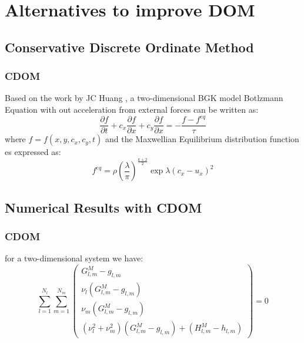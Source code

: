 \section{Alternatives to improve DOM}
\subsection{Conservative Discrete Ordinate Method}

\begin{frame}
	\frametitle{CDOM}
	Based on the work by JC Huang \cite{Yang1995323}, a two-dimensional BGK model Botlzmann Equation with out acceleration from external forces can be written as:
	\begin{equation}
		\frac{\partial f}{\partial t} + c_x \frac{\partial f}{\partial x} + c_y \frac{\partial f}{\partial x} = -\frac{f - f^{eq}}{\tau}
	\end{equation}
	where $f = f (x,y,c_x,c_y,t)$ and the Maxwellian Equilibrium distribution function es expressed as:
	\begin{equation}
		f^{eq} = \rho \left( \frac{\lambda}{\pi} \right) ^{\frac{k+2}{2}} \exp{\lambda (c_x - u_x)^2}
	\end{equation}
\end{frame}

\subsection{Numerical Results with CDOM}

\begin{frame}
	\frametitle{CDOM}
	for a two-dimensional system we have:
	\begin{equation}
		\sum_{l=1}^{N_l}\sum_{m=1}^{N_m} 
			\begin{pmatrix}
			G_{l,m}^{M}-g_{l,m}\\ 
			\nu_l (G_{l,m}^{M}-g_{l,m})\\ 
			\nu_m (G_{l,m}^{M}-g_{l,m})\\ 
			(\nu_l^2+\nu_m^2) (G_{l,m}^{M}-g_{l,m})+(H_{l,m}^{M}-h_{l,m})
			\end{pmatrix} = 0 
	\end{equation}
\end{frame}